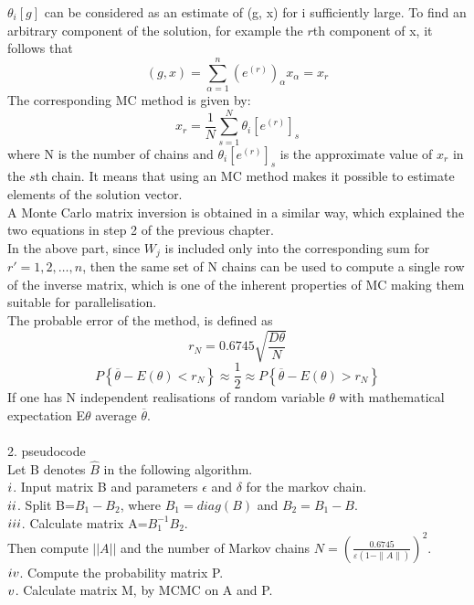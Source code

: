 \documentclass[10pt,journal]{IEEEtran}
\begin{document}
$\theta _ { i } [ g ] $ can be considered as an estimate of (g, x) for i sufficiently large. To find an arbitrary component
of the solution, for example the $r$th component of x, it follows that 
\[( g , x ) = \sum _ { \alpha = 1 } ^ { n } \left( e ^ { ( r ) } \right) _ { \alpha } x _ { \alpha }=x_r\]
The corresponding MC method is given by:
\[x_r= \frac { 1 } { N } \sum _ { s = 1 } ^ { N } \theta _ { i } \left[ e ^ { ( r ) } \right] _ { s }\]
where N is the number of chains and $\theta _ { i } \left[ e ^ { ( r ) } \right] _ { s }$ is the approximate value of $x_r$ in the $s$th chain. It means that using an MC method makes it possible to estimate elements of the solution vector.\\A Monte Carlo matrix inversion is obtained in a similar way, which explained the two equations in step 2 of the previous chapter.
\\
In the above part, since $W_j$ is included only into the corresponding sum for $r' = 1, 2, \ldots, n$, then the same set of N chains can be used to compute a single row of the inverse matrix, which is one of the inherent properties of MC making them suitable for parallelisation.\\
The probable error of the method, is defined as 
\[r _ { N } = 0.6745 \sqrt { \frac { D \theta } { N } }\]
\[P \left\{ \overline { \theta } - E ( \theta ) < r _ { N } \right\} \approx \frac { 1 } { 2 } \approx P \left\{ \overline { \theta } - E ( \theta ) > r _ { N } \right\}\]
If one has N independent realisations of random variable $\theta$ with mathematical expectation E$\theta$ average $\overline { \theta }$.
\\\\
2. pseudocode\\
Let B denotes $\hat{B}$ in the following algorithm.\\
$\romannumeral1$. Input matrix B and parameters $\epsilon$ and $\delta$ for the markov chain.\\
$\romannumeral2$. Split B=$B_1-B_2$, where $B_1=diag(B)$ and $B_2=B_1-B$.\\
$\romannumeral3$. Calculate matrix A=$B_1^{-1}B_2$.\\ Then compute $||A||$ and the number of Markov chains $N = \left( \frac { 0.6745 } { \varepsilon ( 1 - \| A \| ) } \right) ^ { 2 }$.\\
$\romannumeral4$. Compute the probability matrix P.\\
$\romannumeral5$. Calculate matrix M, by MCMC on A and P.\\
\scriptsize
\end{document}
